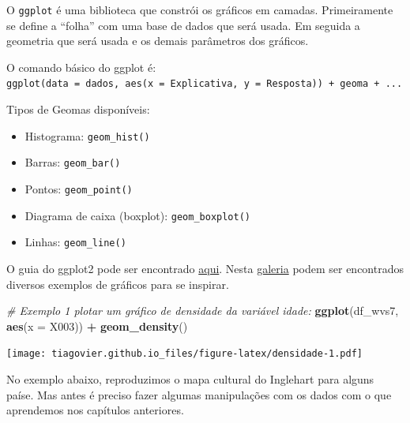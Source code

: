 \documentclass[
  brazil,
]{book}
\newenvironment{Shaded}{\begin{snugshade}}{\end{snugshade}}
\newcommand{\CommentTok}[1]{\textcolor[rgb]{0.56,0.35,0.01}{\textit{#1}}}
\newcommand{\DataTypeTok}[1]{\textcolor[rgb]{0.13,0.29,0.53}{#1}}
\newcommand{\KeywordTok}[1]{\textcolor[rgb]{0.13,0.29,0.53}{\textbf{#1}}}
\newcommand{\NormalTok}[1]{#1}
\newcommand{\OperatorTok}[1]{\textcolor[rgb]{0.81,0.36,0.00}{\textbf{#1}}}
\newcommand{\StringTok}[1]{\textcolor[rgb]{0.31,0.60,0.02}{#1}}
\providecommand{\tightlist}{%
  \setlength{\itemsep}{0pt}\setlength{\parskip}{0pt}}
\begin{document}
O \texttt{ggplot} é uma biblioteca que constrói os gráficos em camadas. Primeiramente se define a ``folha'' com uma base de dados que será usada. Em seguida a geometria que será usada e os demais parâmetros dos gráficos.

O comando básico do ggplot é: \texttt{ggplot(data\ =\ dados,\ aes(x\ =\ Explicativa,\ y\ =\ Resposta))\ +\ geoma\ +\ ...}

Tipos de Geomas disponíveis:

\begin{itemize}
\tightlist
\item
  Histograma: \texttt{geom\_hist()}
\item
  Barras: \texttt{geom\_bar()}
\item
  Pontos: \texttt{geom\_point()}
\item
  Diagrama de caixa (boxplot): \texttt{geom\_boxplot()}
\item
  Linhas: \texttt{geom\_line()}
\end{itemize}

O guia do ggplot2 pode ser encontrado \href{https://ggplot2.tidyverse.org/index.html}{aqui}. Nesta \href{https://www.r-graph-gallery.com/}{galeria} podem ser encontrados diversos exemplos de gráficos para se inspirar.

\begin{Shaded}
\begin{Highlighting}[]
\CommentTok{# Exemplo 1 plotar um gráfico de densidade da variável idade: }
\KeywordTok{ggplot}\NormalTok{(df_wvs7, }\KeywordTok{aes}\NormalTok{(}\DataTypeTok{x =}\NormalTok{ X003)) }\OperatorTok{+}\StringTok{ }\KeywordTok{geom_density}\NormalTok{() }
\end{Highlighting}
\end{Shaded}

\texttt{[image: tiagovier.github.io\_files/figure-latex/densidade-1.pdf]}

No exemplo abaixo, reproduzimos o mapa cultural do Inglehart \citep{inglehart_modernization_2005} para alguns paíse. Mas antes é preciso fazer algumas manipulações com os dados com o que aprendemos nos capítulos anteriores.
\end{document}
